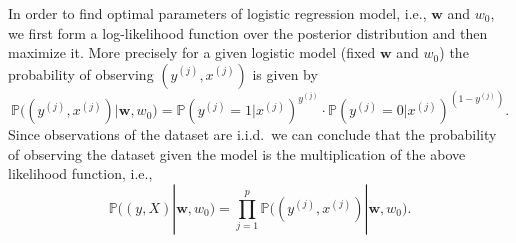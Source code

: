 \documentclass[11pt]{article}
\newcommand{\w}{\textbf{w}}
\newcommand{\Pro}{\mathbb{P}}
\begin{document}
In order to find optimal parameters of logistic regression model, i.e., $\w$ and $w_0$, we first form a log-likelihood function over the posterior distribution and then maximize it. More precisely for a given logistic model (fixed $\w$ and $w_0$) the probability of observing $(y^{(j)}, x^{(j)})$ is given by 
\begin{equation}
	\Pro\big((y^{(j)}, x^{(j)})| \w, w_0\big) = 
	\Pro(y^{(j)}=1|x^{(j)})^{y^{(j)}} \cdot
	\Pro(y^{(j)}=0|x^{(j)})^{(1-y^{(j)})}.
\end{equation}
Since observations of the dataset are i.i.d.~we can conclude that the probability of observing the dataset given the model is the multiplication of the above likelihood function, i.e.,
\begin{equation}
	\Pro\big((y, X)| \w, w_0\big) = \prod_{j=1}^{p} \Pro\big((y^{(j)}, x^{(j)})| \w, w_0\big).
\end{equation}
\end{document}
